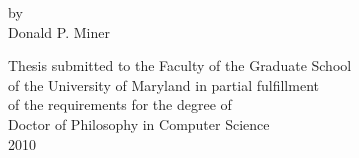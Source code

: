 \begin{titlepage}
\mbox{}\vspace{1in}
\begin{center}

    {\Large \bf \thesistitle \par}
    
\vspace{2in}

    {\large by} \\
    {\large Donald P. Miner}
    
\vspace{2in}

  \begin{singlespace}
    Thesis submitted to the Faculty of the Graduate School \\
    of the University of Maryland in partial fulfillment \\
    of the requirements for the degree of \\
    Doctor of Philosophy in Computer Science \\
    2010
	\end{singlespace}
\end{center}
\end{titlepage}
